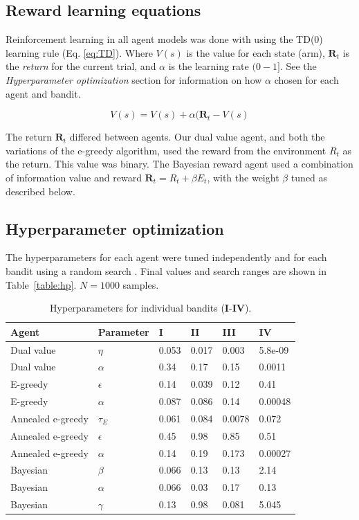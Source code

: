 \documentclass[9pt,lineno]{elife}
\begin{document}
\subsection*{Reward learning equations} Reinforcement learning in all agent models was done with using the TD(0) learning rule \citep{Sutton2018} (Eq. \ref{eq:TD}). Where $V(s)$ is the value for each state (arm), $\mathbf{R}_t$ is the \emph{return} for the current trial, and $\alpha$ is the learning rate $(0-1]$. See the \emph{Hyperparameter optimization} section for information on how $\alpha$ chosen for each agent and bandit.

\begin{equation}
	\label{eq:TD}
	V(s) = V(s) + \alpha (\mathbf{R}_t - V(s)
\end{equation}

The return $\mathbf{R}_t$ differed between agents. Our dual value agent, and both the variations of the e-greedy algorithm, used the reward from the environment $R_t$ as the return. This value was binary. The Bayesian reward agent used a combination of information value and reward $\mathbf{R}_t = R_t + \beta E_t$, with the weight $\beta$ tuned as described below. 

\subsection*{Hyperparameter optimization}
The hyperparameters for each agent were tuned independently and for each bandit using a random search \citep{Bergstra}. Final values and search ranges are shown in Table~\ref{table:hp}. $N=1000$ samples.

\begin{table}[]
\caption{Hyperparameters for individual bandits (\textbf{I}-\textbf{IV}).}
\label{tab:hp}
\begin{tabular}{|l|l|l|l|l|l|}
\hline
\textbf{Agent} & \textbf{Parameter} & \textbf{I} & \textbf{II} & \textbf{III} & \textbf{IV} \\ \hline
Dual value & $\eta$ & 0.053 & 0.017 & 0.003 & 5.8e-09 \\ \hline
Dual value & $\alpha$ & 0.34 & 0.17 & 0.15 & 0.0011 \\ \hline
E-greedy & $\epsilon$ & 0.14 & 0.039 & 0.12 & 0.41 \\ \hline
E-greedy & $\alpha$ & 0.087 & 0.086 & 0.14 & 0.00048 \\ \hline
Annealed e-greedy & $\tau_E$ & 0.061 & 0.084 & 0.0078 & 0.072 \\ \hline
Annealed e-greedy & $\epsilon$ & 0.45 & 0.98 & 0.85 & 0.51 \\ \hline
Annealed e-greedy & $\alpha$ & 0.14 & 0.19 & 0.173 & 0.00027 \\ \hline
Bayesian & $\beta$ & 0.066 & 0.13 & 0.13 & 2.14 \\ \hline
Bayesian & $\alpha$ & 0.066 & 0.03 & 0.17 & 0.13 \\ \hline
Bayesian & $\gamma$ & 0.13 & 0.98 & 0.081 & 5.045 \\ \hline
\end{tabular}
\end{table}
\end{document}
